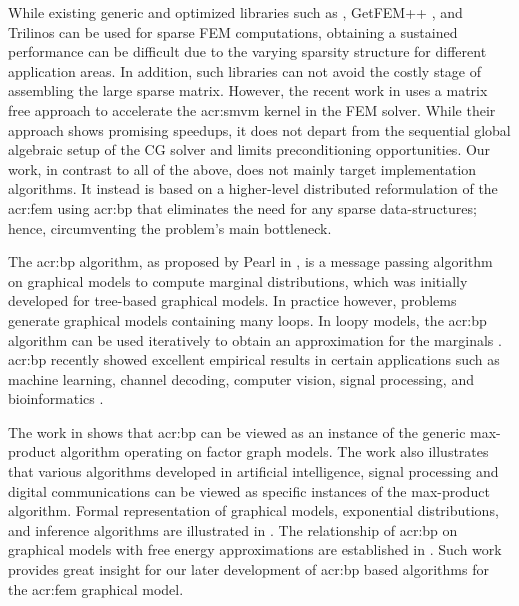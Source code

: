 While existing generic and optimized libraries such as \dealName{} \cite{bib:dealii2007}, GetFEM++ \cite{bib:getfem}, and Trilinos \cite{bib:Trilinos} can be used for sparse FEM computations, obtaining a sustained performance can be difficult due to the varying sparsity structure for different application areas.
In addition, such libraries can not avoid the costly stage of assembling the large sparse matrix.
However, the recent work in \cite{bib:Kronbichler2012} uses a matrix free approach to accelerate the \gls{acr:smvm} kernel in the FEM solver.
While their approach shows promising speedups, it does not depart from the sequential global algebraic setup of the CG solver and limits preconditioning opportunities.
Our work, in contrast to all of the above, does not mainly target implementation algorithms.
It instead is based on a higher-level distributed reformulation of the \gls{acr:fem} using \acrfull{acr:bp} that eliminates the need for any sparse data-structures; hence, circumventing the problem's main bottleneck.


The \gls{acr:bp} algorithm, as proposed by Pearl in \cite{bib:Pearl88ProbabilisticReasoning}, is a message passing algorithm on graphical models to compute marginal distributions, which was initially developed for tree-based graphical models.
In practice however, problems generate graphical models containing many loops.
In loopy models, the \gls{acr:bp} algorithm can be used iteratively to obtain an approximation for the marginals \cite{bib:Pearl88ProbabilisticReasoning,bib:Yedidia2004CFEAAGBPA,bib:Weiss01CorrectnessBelief,bib:Wainwright03tbrfasp}.
\gls{acr:bp} recently showed excellent empirical results in certain applications such as machine learning, channel decoding, computer vision, signal processing, and bioinformatics \cite{bib:Kschischang2001FGATSA, bib:Wainwright2008GMEFAVI,bib:Luby2001ILDPC,bib:Mceliece98turbodecoding,Richardson2001CLDPC,bib:cv1999,bibSun2003SMU,bib:Frey2001NIPS,bib:Kolmogorov2006ctr,bib:Weiss2005gobp,bib:Szeliski2008CS,bib:sudderth2008signal,bib:mitrofanova2008integrative}.


The work in \cite{bib:Kschischang2001FGATSA} shows that \gls{acr:bp} can be viewed as an instance of the generic max-product algorithm operating on factor graph models.
The work also illustrates that various algorithms developed in artificial intelligence, signal processing and digital communications can be viewed as specific instances of the max-product algorithm.
Formal representation of graphical models, exponential distributions, and inference algorithms are illustrated in \cite{bib:Wainwright2008GMEFAVI,bib:PGMkoller2009,bib:Kschischang2001FGATSA}.
The relationship of \gls{acr:bp} on graphical models with free energy approximations are established in \cite{bib:Yedidia2004CFEAAGBPA,bib:Yedidia2000genbp,bib:yedidia2003understanding,bib:weiss2012map}.
Such work provides great insight for our later development of \gls{acr:bp} based algorithms for the \gls{acr:fem} graphical model.


